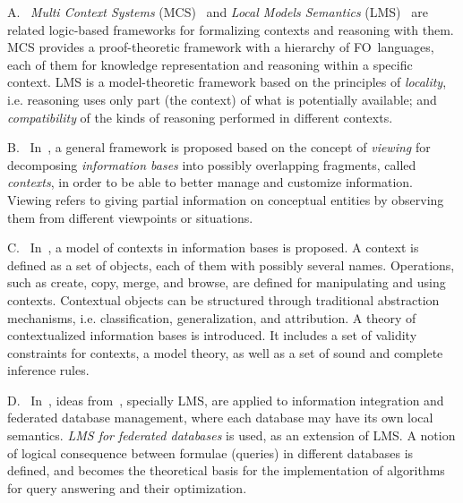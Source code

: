 \documentclass[format=acmsmall, review=false, screen=true]{acmart}
\newcommand{\fo}{FO}
\begin{document}
\noindent A. \ {\em Multi Context Systems} (MCS)~\citep{giunchiglia94} and {\em Local Models Semantics} (LMS)~\citep{ghidini01,ghidini} are related logic-based frameworks for formalizing contexts and reasoning with them. MCS provides a  proof-theoretic framework with a hierarchy of \fo \ languages, each of them for knowledge representation and reasoning within a specific context. LMS is a model-theoretic framework based on the principles of {\em locality}, i.e. reasoning uses only part (the context) of what is potentially available; and {\em compatibility} of the kinds of reasoning performed in different contexts.


\noindent B. \ In~\citep{motschnig95,motschnig}, a general framework is proposed based on the concept of {\em viewing} for decomposing {\em information bases} into possibly overlapping fragments, called {\em contexts}, in order to be able to better manage and customize information. Viewing refers to giving partial information on conceptual entities by observing them from different viewpoints or situations.

\noindent C. \ In~\citep{analyti,theodorakis}, a model of contexts in information bases is proposed. A context is defined as a set of objects,  each of them with possibly several names. Operations, such as create, copy, merge, and browse, are defined for manipulating and using contexts. Contextual objects can be structured through traditional abstraction mechanisms, i.e. classification, generalization, and attribution. A theory of contextualized information bases is introduced. It includes a set of validity constraints for contexts, a model theory, as well as a set of sound and complete inference rules.



\noindent D. \ In~\citep{ghidini98},  ideas from~\citep{ghidini01}, specially LMS, are applied  to information integration and federated database management, where each database may have its own local semantics.  {\em LMS for federated databases} is used, as an extension of LMS. A notion of logical consequence between formulae (queries) in different databases is defined, and becomes the theoretical basis for the implementation of algorithms for query answering and their optimization.
\end{document}
